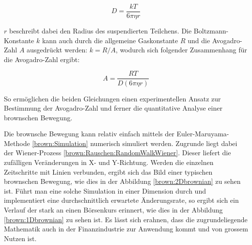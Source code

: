 \begin{equation}
	D = \frac{kT}{6\pi\eta r}
\end{equation}

$ r $ beschreibt dabei den Radius des suspendierten Teilchens. Die Boltzmann-Konstante $ k $ kann auch durch die allgemeine Gaskonstante $ R $ und die Avogadro-Zahl $ A $ ausgedrückt werden: $ k = R/A $, wodurch sich folgender Zusammenhang für die Avogadro-Zahl ergibt:

\begin{equation}
	A = \frac{R T}{D (6 \pi \eta r)}
\end{equation}

So ermöglichen die beiden Gleichungen einen experimentellen Ansatz zur Bestimmung der Avogadro-Zahl und ferner die quantitative Analyse einer brownschen Bewegung.

Die brownsche Bewegung kann relativ einfach mittels der Euler-Maruyama-Methode \ref{brown:Simulation} numerisch simuliert werden. Zugrunde liegt dabei der Wiener-Prozess \ref{brown:Rauschen:RandomWalkWiener}. Dieser liefert die zufälligen Veränderungen in X- und Y-Richtung. Werden die einzelnen Zeitschritte mit Linien verbunden, ergibt sich das Bild einer typischen brownschen Bewegung, wie dies in der Abbildung \ref{brown:2Dbrownian} zu sehen ist. Führt man eine solche Simulation in einer Dimension durch und implementiert eine durchschnittlich erwartete Änderungsrate, so ergibt sich ein Verlauf der stark an einen Börsenkurs erinnert, wie dies in der Abbildung \ref{brown:1Dbrownian} zu sehen ist. Es lässt sich erahnen, dass die zugrundeliegende Mathematik auch in der Finanzindustrie zur Anwendung kommt und von grossem Nutzen ist.

